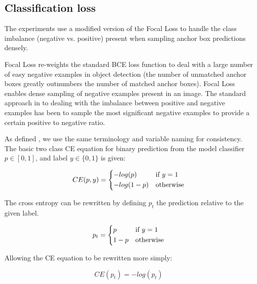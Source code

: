 \subsection {Classification loss}
\label{sec:loss}

The experiments use a modified version of the Focal Loss \cite{Lin2017} to handle the class imbalance (negative vs. positive) present when sampling anchor box predictions densely.

Focal Loss \cite{Lin2017} re-weights the standard \gls{BCE} loss function to deal with a large number of easy negative examples in object detection (the number of unmatched anchor boxes greatly outnumbers the number of matched anchor boxes). Focal Loss enables dense sampling of negative examples present in an image. The standard approach in to dealing with the imbalance between positive and negative examples has been to sample the most significant negative examples to provide a certain positive to negative ratio.

As defined \cite{Lin2017}, we use the same terminology and variable naming for consistency. The basic two class \gls{CE} equation for binary prediction from the model classifier $p \in \left[0, 1\right]$, and label $y \in \{0, 1\}$  is given:

\begin{equation}
CE(p, y) = 
  \begin{cases*}
  -log(p) & if $y = 1$\\
  -log(1-p) & otherwise\\
  \end{cases*}
\label{eq:cross_entropy}
\end{equation}


The cross entropy can be rewritten by defining $p_t$ the prediction relative to the given label.

\begin{equation}
p_t = 
  \begin{cases*}
  p & if $y = 1$\\
  1 - p & otherwise\\
  \end{cases*}
\label{eq:class_prob}
\end{equation}

Allowing the \gls{CE} equation to be rewritten more simply:

\begin{equation}
CE(p_t) = -log(p_t)
\label{eq:short_cross_entropy}
\end{equation}



